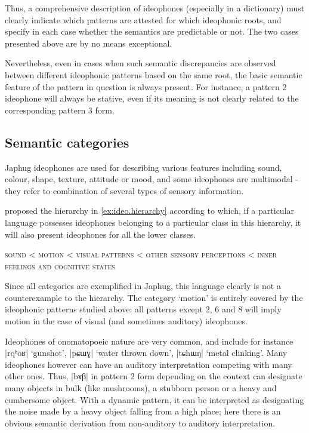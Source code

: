 \documentclass[oldfontcommands,oneside,a4paper,11pt]{article}
\newcommand{\ipa}[1]{{\phon \mbox{#1}}} %
\begin{document}
  
 Thus, a comprehensive description of ideophones (especially in a dictionary) must clearly indicate which patterns are attested for which ideophonic roots, and specify in each case whether the semantics are predictable or not. The two cases presented above are by no means exceptional.


Nevertheless, even in cases when such semantic discrepancies are observed between different ideophonic patterns based on the same root, the basic semantic feature of the pattern in question is always present. For instance, a pattern 2 ideophone will always be stative, even if its meaning is not clearly related to the corresponding pattern 3 form.

\subsection{Semantic categories}
Japhug ideophones are used for describing various features including sound, colour, shape, texture, attitude or mood, and some ideophones are multimodal - they refer to combination of several types of sensory information.

\citet[663]{dingemanse12ideo} proposed the hierarchy in \ref{ex:ideo.hierarchy} according to which, if a particular language possesses ideophones belonging to a particular class in this hierarchy, it will also present ideophones for all the lower classes.
  \begin{exe} 
\ex  \label{ex:ideo.hierarchy}
\glt \textsc{sound} < \textsc{motion} < \textsc{visual patterns}  < \textsc{other sensory perceptions} < \textsc{inner feelings and cognitive states}
  \end{exe}
Since all categories are exemplified in Japhug, this language  clearly is not a counterexample to the hierarchy. The category  `motion' is entirely covered by the  ideophonic patterns studied above: all patterns except 2, 6 and 8 will imply motion in the case of visual (and sometimes auditory) ideophones.

 Ideophones of onomatopoeic nature  are very common, and include for instance   |\ipa{rqʰoʁ}| `gunshot', |\ipa{pɕɯɣ}| `water thrown down', |\ipa{tɕhɯŋ}| `metal clinking'. Many ideophones however can have an auditory interpretation competing with many other ones. Thus, |\ipa{bɤβ}| in pattern 2 form depending on the context can designate many objects in bulk (like mushrooms), a stubborn person or a heavy and cumbersome object. With a dynamic   pattern, it can be interpreted as designating the noise made by a heavy object falling from a high place; here there is an obvious semantic derivation from non-auditory to auditory interpretation.
 
\end{document}
